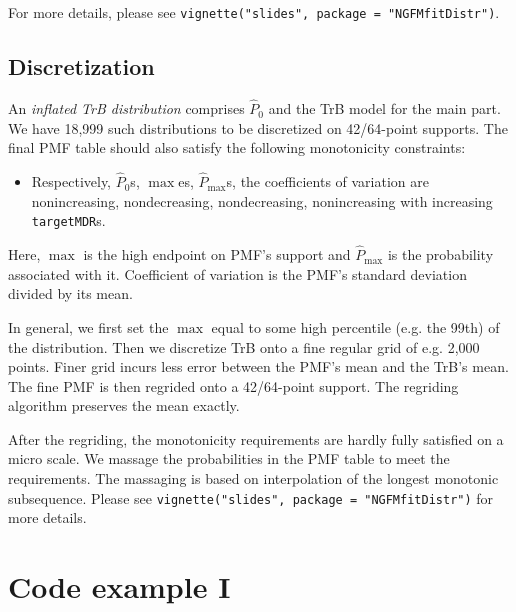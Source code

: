 \documentclass[12pt,letterpaper]{article}
\begin{document}
For more details, please see \texttt{vignette("slides", package = "NGFMfitDistr")}.

\subsection{Discretization}
An \textit{inflated TrB distribution} comprises $\hat{P}_0$ and the TrB model for the main part. We have 18,999 such distributions to be discretized on 42/64-point supports. The final PMF table should also satisfy the following monotonicity constraints:
\begin{itemize}
\item Respectively, $\hat{P}_0$s, $\max$es, $\hat{P}_{\max}$s, the coefficients of variation are nonincreasing, nondecreasing, nondecreasing, nonincreasing with increasing \texttt{targetMDR}s.
\end{itemize}
Here, $\max$ is the high endpoint on PMF's support and $\hat{P}_{\max}$ is the probability associated with it. Coefficient of variation is the PMF's standard deviation divided by its mean.

In general, we first set the $\max$ equal to some high percentile (e.g. the 99th) of the distribution. Then we discretize TrB onto a fine regular grid of e.g. 2,000 points. Finer grid incurs less error between the PMF's mean and the TrB's mean. The fine PMF is then regrided onto a 42/64-point support. The regriding algorithm preserves the mean exactly.

After the regriding, the monotonicity requirements are hardly fully satisfied on a micro scale. We massage the probabilities in the PMF table to meet the requirements. The massaging is based on interpolation of the longest monotonic subsequence. Please see \texttt{vignette("slides", package = "NGFMfitDistr")} for more details.



\section{Code example I}
\end{document}
